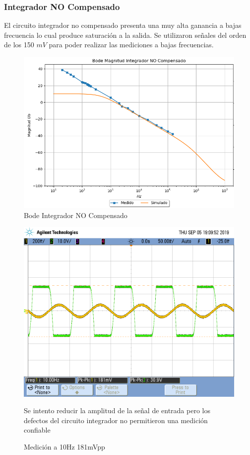 \documentclass[a4paper]{article}
\begin{document}
\subsubsection{Integrador NO Compensado}
El circuito integrador no compensado presenta una muy alta ganancia a bajas frecuencia lo cual produce saturación a la salida. Se utilizaron señales del orden de los 150 $mV$ para poder realizar las mediciones a bajas frecuencias.
\begin{figure}[H]
	\centering
	\includegraphics[width=\textwidth]{Ejercicio4/SUPERPOSICION-BODE-INTEGRADOR-NO-COMPENSADO}
	\caption{Bode Integrador NO Compensado}
\end{figure}

\begin{figure}[H]
	\centering
	\includegraphics[width=\textwidth]{Ejercicio4/FOTOS-TP2-TC-EJ4/SaturaNoCompensado181mv}
	\caption{Medición a 10Hz 181mVpp}
Se intento reducir la amplitud de la señal de entrada pero los defectos del circuito integrador no permitieron una medición confiable
\end{figure}
\end{document}
